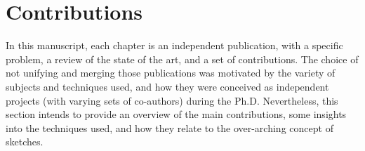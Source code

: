  \section{Contributions}\label{intro:sec:contrib}


In this manuscript, each chapter is  an independent publication, with a specific problem, a review of the state of the art, and a set of contributions. The choice of not unifying and merging those publications was motivated by the variety of subjects and techniques used, and how they were conceived as independent projects (with varying sets of co-authors) during the Ph.D. Nevertheless, this section intends to provide an overview of the main contributions, some insights into the techniques used, and how they relate to the over-arching concept of sketches.


